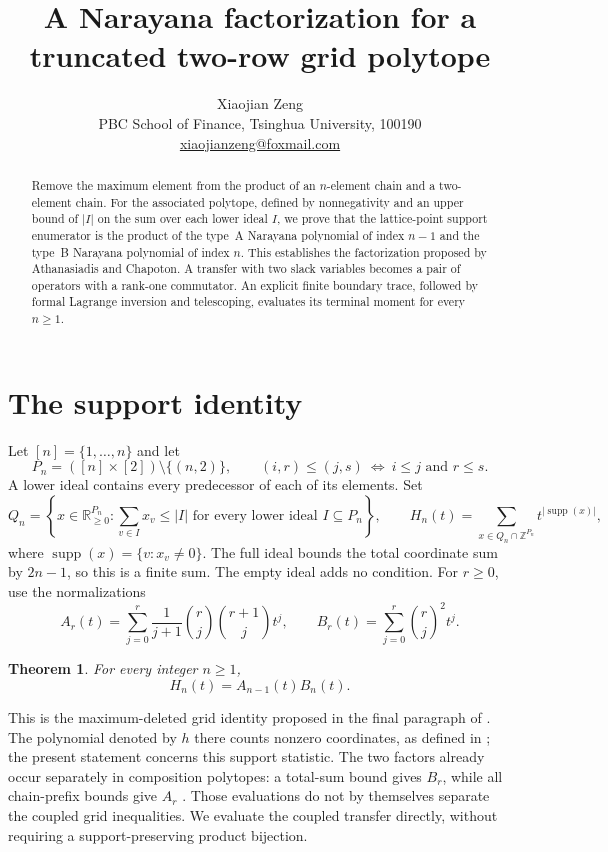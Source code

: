 \documentclass[11pt]{article}
\title{A Narayana factorization for a truncated two-row grid polytope}
\author{Xiaojian Zeng\\[3pt]
\small PBC School of Finance, Tsinghua University, 100190\\
\small \href{mailto:xiaojianzeng@foxmail.com}{xiaojianzeng@foxmail.com}}
\date{}
\newtheorem{theorem}{Theorem}
\DeclareMathOperator{\supp}{supp}
\newcommand{\Z}{\mathbb Z}
\begin{document}
\maketitle
\begin{abstract}
Remove the maximum element from the product of an $n$-element chain and
a two-element chain. For the associated polytope, defined by nonnegativity
and an upper bound of $|I|$ on the sum over each lower ideal $I$, we prove
that the lattice-point support enumerator is the product of the type~A
Narayana polynomial of index $n-1$ and the type~B Narayana polynomial of
index $n$. This establishes the factorization proposed by Athanasiadis
and Chapoton. A transfer with two slack variables becomes a pair of
operators with a rank-one commutator. An explicit finite boundary trace,
followed by formal Lagrange inversion and telescoping, evaluates its
terminal moment for every $n\geq1$.
\end{abstract}

\section{The support identity}
Let $[n]=\{1,\ldots,n\}$ and let
\[
 P_n=([n]\times[2])\setminus\{(n,2)\},
 \qquad (i,r)\leq(j,s)\ \Longleftrightarrow\ i\leq j\text{ and }r\leq s.
\]
A lower ideal contains every predecessor of each of its elements. Set
\[
 Q_n=\left\{x\in\mathbb R_{\geq0}^{P_n}:
          \sum_{v\in I}x_v\leq |I|
          \text{ for every lower ideal }I\subseteq P_n\right\},
 \qquad
 H_n(t)=\sum_{x\in Q_n\cap\Z^{P_n}}t^{|\supp(x)|},
\]
where $\supp(x)=\{v:x_v\ne0\}$. The full ideal bounds the total coordinate
sum by $2n-1$, so this is a finite sum. The empty ideal adds no condition.
For $r\geq0$, use the normalizations
\begin{equation}\label{eq:narayana}
 A_r(t)=\sum_{j=0}^r\frac{1}{j+1}\binom rj\binom{r+1}j t^j,
 \qquad B_r(t)=\sum_{j=0}^r\binom rj^2t^j.
\end{equation}

\begin{theorem}\label{thm:main}
For every integer $n\geq1$,
\begin{equation}\label{eq:main}
 H_n(t)=A_{n-1}(t)B_n(t).
\end{equation}
\end{theorem}

This is the maximum-deleted grid identity proposed in the final paragraph
of \cite[Section~9.3]{AC26}. The polynomial denoted by $h$ there counts
nonzero coordinates, as defined in \cite[Section~5]{AC26}; the present
statement concerns this support statistic. The two factors already occur
separately in composition polytopes: a total-sum bound gives $B_r$, while
all chain-prefix bounds give $A_r$ \cite[Examples~2.3--2.4]{Ath25}.
Those evaluations do not by themselves separate the coupled grid
inequalities. We evaluate the coupled transfer directly, without requiring
a support-preserving product bijection.
\end{document}
